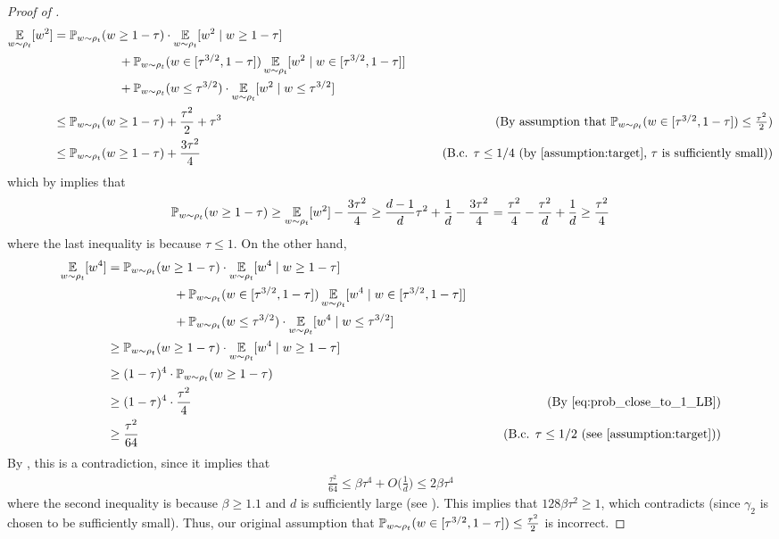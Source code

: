 \begin{proof}[Proof of ]
\begin{align}
\E_{\w \sim \rho_t}[\w^2]
& = \Prob_{\w \sim \rho_t} (\w \geq 1 - \tau) \cdot \E_{\w \sim \rho_t}[\w^2 \mid \w \geq 1 - \tau] \\
& \nextlinespace\nextlinespace + \Prob_{\w \sim \rho_t} (\w \in [\tau^{3/2}, 1 - \tau]) \E_{\w \sim \rho_t}[\w^2 \mid \w \in [\tau^{3/2}, 1 - \tau]] \\
& \nextlinespace\nextlinespace + \Prob_{\w \sim \rho_t} (\w \leq \tau^{3/2}) \cdot \E_{\w \sim \rho_t} [\w^2 \mid \w \leq \tau^{3/2}] \\
& \leq \Prob_{\w \sim \rho_t}(\w \geq 1 - \tau) + \frac{\tau^2}{2} + \tau^3
& \tag{By assumption that $\Prob_{\w \sim \rho_t}(\w \in [\tau^{3/2}, 1 - \tau]) \leq \frac{\tau^2}{2}$} \\
& \leq \Prob_{\w \sim \rho_t} (\w \geq 1 - \tau) + \frac{3\tau^2}{4}
& \tag{B.c. $\tau \leq 1/4$ (by \Cref{assumption:target}, $\tau$ is sufficiently small)}
\end{align}
which by  implies that
\begin{align} \label{eq:prob_close_to_1_LB}
\mathbb{P}_{w \sim \rho_t}(w \geq 1 - \tau)
 \geq \operatorname*{\mathbb{E}}_{w \sim \rho_t}[w^2] - \frac{3\tau^2}{4} 
 \geq \frac{d - 1}{d} \tau^2 + \frac{1}{d} - \frac{3\tau^2}{4} 
 = \frac{\tau^2}{4} - \frac{\tau^2}{d} + \frac{1}{d} 
 \geq \frac{\tau^2}{4}
\end{align}
where the last inequality is because $\tau \leq 1$. On the other hand,
\begin{align}
\E_{\w \sim \rho_t}[\w^4] 
& = \Prob_{\w \sim \rho_t}(\w \geq 1 - \tau) \cdot \E_{\w \sim \rho_t}[\w^4 \mid \w \geq 1 - \tau] \\
& \nextlinespace\nextlinespace + \Prob_{\w \sim \rho_t}(\w \in [\tau^{3/2}, 1 - \tau]) \E_{\w \sim \rho_t}[\w^4 \mid \w \in [\tau^{3/2}, 1 - \tau]] \\
& \nextlinespace\nextlinespace + \Prob_{\w \sim \rho_t} (\w \leq \tau^{3/2}) \cdot \E_{\w \sim \rho_t}[\w^4 \mid \w \leq \tau^{3/2}] \\
& \geq \Prob_{\w \sim \rho_t}(\w \geq 1 - \tau) \cdot \E_{\w \sim \rho_t}[\w^4 \mid \w \geq 1 - \tau] \\
& \geq (1 - \tau)^4 \cdot \Prob_{\w \sim \rho_t} (\w \geq 1 - \tau) \\
& \geq (1 - \tau)^4 \cdot \frac{\tau^2}{4}
& \tag{By \Cref{eq:prob_close_to_1_LB}} \\
& \geq \frac{\tau^2}{64}
& \tag{B.c. $\tau \leq 1/2$ (see \Cref{assumption:target})}
\end{align}
By , this is a contradiction, since it implies that
\begin{align}
\frac{\tau^2}{64} 
 \leq \beta \tau^4 + O\Big(\frac{1}{d}\Big)
 \leq 2 \beta \tau^4 
\end{align}
where the second inequality is because $\beta \geq 1.1$ and $d$ is sufficiently large (see ). This implies that $128 \beta \tau^2 \geq 1$, which contradicts  (since $\gamma_2$ is chosen to be sufficiently small). Thus, our original assumption that $\mathbb{P}_{w \sim \rho_t}(w \in [\tau^{3/2}, 1 - \tau]) \leq \frac{\tau^2}{2}$ is incorrect.
\end{proof}
